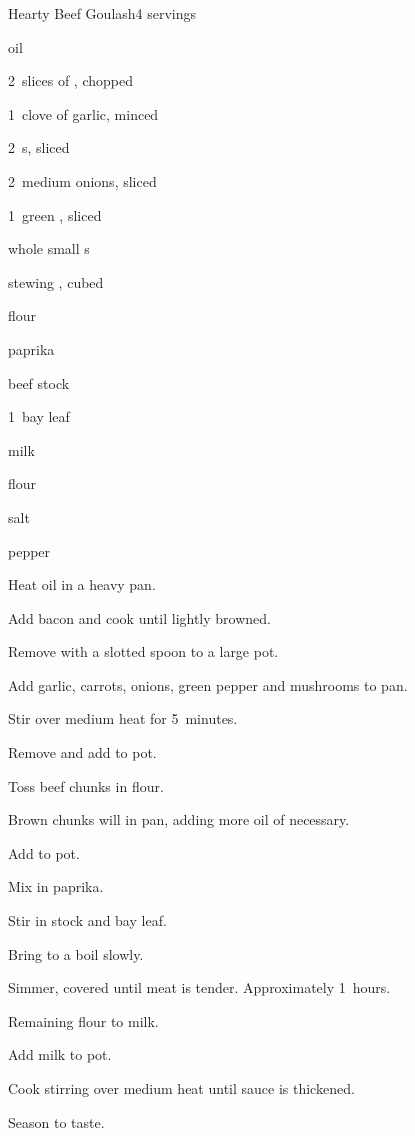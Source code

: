 \begin{recipe}{Hearty Beef Goulash}{}{4 servings}

\begin{ingredients}
\item {} oil
\item 2~slices of , chopped
\item 1~clove of garlic, minced
\item 2~s, sliced
\item 2~medium onions, sliced
\item 1~green , sliced
\item \lbs{\quarter} whole small s
\item \lbs{1\half} stewing , cubed
\item \C{\quarter} flour
\item {} paprika
\item {} beef stock
\item 1~bay leaf
\item {} milk
\item {} flour
\item salt
\item pepper
\end{ingredients}

\begin{directions}
\item Heat oil in a heavy pan.
\item Add bacon and cook until lightly browned.
\item Remove with a slotted spoon to a large pot.
\item Add garlic, carrots, onions, green pepper and mushrooms to pan.
\item Stir over medium heat for 5~minutes.
\item Remove and add to pot.
\item Toss beef chunks in flour.
\item Brown chunks will in pan, adding more oil of necessary.
\item Add to pot.
\item Mix in paprika.
\item Stir in stock and bay leaf.
\item Bring to a boil slowly.
\item Simmer, covered until meat is tender. Approximately 1\half~hours.
\item Remaining flour to milk.
\item Add milk to pot.
\item Cook stirring over medium heat until sauce is thickened.
\item Season to taste.
\end{directions}

\end{recipe}
